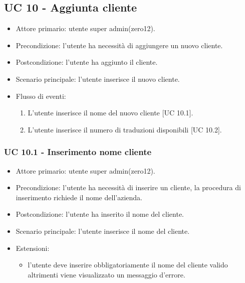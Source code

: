 \subsection{UC 10 - Aggiunta cliente}
    \begin{itemize}
        \item Attore primario: utente super admin(zero12).
        \item Precondizione: l'utente ha necessità di aggiungere un nuovo cliente.
        \item Postcondizione: l'utente ha aggiunto il cliente.
        \item Scenario principale: l'utente inserisce il nuovo cliente.
        \item Flusso di eventi:
        \begin{enumerate}
            \item L'utente inserisce il nome del nuovo cliente [UC 10.1].
            \item L'utente inserisce il numero di traduzioni disponibili [UC 10.2].
        \end{enumerate}
    \end{itemize}
    \subsubsection{UC 10.1 - Inserimento nome cliente}
        \begin{itemize}
            \item Attore primario: utente super admin(zero12).
            \item Precondizione: l'utente ha necessità di inserire un cliente, la procedura di inserimento richiede il nome dell'azienda.
            \item Postcondizione: l'utente ha inserito il nome del cliente.
            \item Scenario principale: l'utente inserisce il nome del cliente.
            \item Estensioni: 
                \begin{itemize}
                    \item l'utente deve inserire obbligatoriamente il nome del cliente valido altrimenti viene visualizzato un messaggio d'errore.
                \end{itemize}
        \end{itemize}
